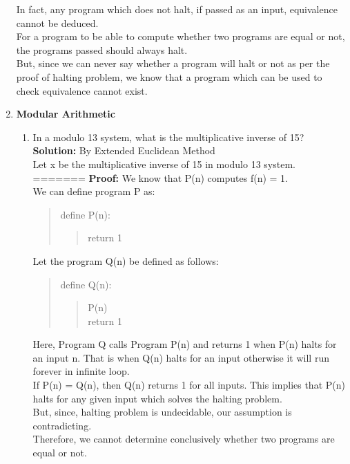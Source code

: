 \documentclass[12pt]{article}
\begin{document}
\begin{enumerate}
In fact, any program which does not halt, if passed as an input, equivalence cannot be deduced. \\
For a program to be able to compute whether two programs are equal or not, the programs passed should always halt.\\
But, since we can never say whether a program will halt or not as per the proof of halting problem, we know that a program which can be used to check equivalence cannot exist.\\
\pagebreak
\item {\textbf{Modular Arithmetic}}
\begin{enumerate}
\item {In a modulo 13 system, what is the multiplicative inverse of 15?}\\
\textbf{Solution:} By Extended Euclidean Method\\
Let x be the multiplicative inverse of 15 in modulo 13 system.\\
=======
\textbf{Proof:} We know that P(n) computes f(n) = 1. \\
We can define program P as:\\
        \begin{quote}
        	define P(n):\\
		    \begin{quote}
		    return 1\\
		    \end{quote}
		\end{quote}    
Let the program Q(n) be defined as follows:\\
		\begin{quote}
		define Q(n):\\
			\begin{quote}
		    P(n)\\
		    return 1\\
		    \end{quote}
		\end{quote}    
		
Here, Program Q calls Program P(n) and returns 1 when P(n) halts for an input n. That is when Q(n) halts for an input otherwise it will run forever in infinite loop.\\
If P(n) = Q(n), then Q(n) returns 1 for all inputs. This implies that P(n) halts for any given input which solves the halting problem. \\
But, since, halting problem is undecidable, our assumption is contradicting.\\
Therefore, we cannot determine conclusively whether two programs are equal or not.  \\



\end{enumerate}
\end{enumerate}
\end{document}
